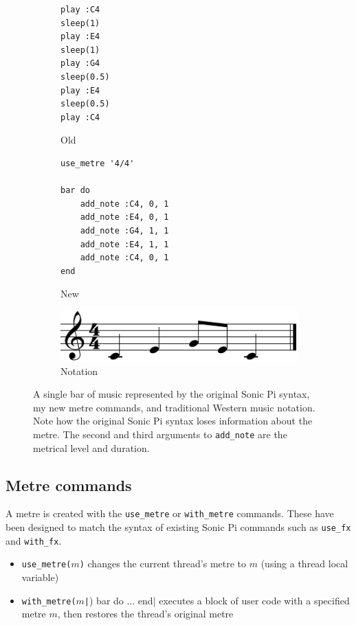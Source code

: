 \documentclass[12pt,twoside,openright]{report}
\begin{document}
\begin{figure}[ht]
    \centering
    \begin{subfigure}[b]{0.2\textwidth}
        \centering
        \begin{verbatim}
play :C4
sleep(1)
play :E4
sleep(1)
play :G4
sleep(0.5)
play :E4
sleep(0.5)
play :C4
        \end{verbatim}
        \caption{Old}
    \end{subfigure}
    \begin{subfigure}[b]{0.4\textwidth}
        \centering
        \begin{verbatim}
use_metre '4/4'

bar do
    add_note :C4, 0, 1
    add_note :E4, 0, 1
    add_note :G4, 1, 1
    add_note :E4, 1, 1
    add_note :C4, 0, 1
end
        \end{verbatim}
        \caption{New}
    \end{subfigure}
    \begin{subfigure}[b]{0.3\textwidth}
        \centering
        \includegraphics[width=\linewidth]{figures/sonic_pi_comparison.pdf}
        \caption{Notation}
    \end{subfigure}
    \cprotect\caption{A single bar of music represented by the original Sonic Pi syntax, my new metre commands, and traditional Western music notation. Note how the original Sonic Pi syntax loses information about the metre. The second and third arguments to \verb'add_note' are the metrical level and duration.}
    \label{fig:sonicpi_language_comparison}
\end{figure}


\subsection{Metre commands} \label{metre_commands}

A metre is created with the \verb'use_metre' or \verb'with_metre' commands. These have been
designed to match the syntax of existing Sonic Pi commands such as \verb'use_fx' and \verb'with_fx'.

\begin{itemize}
	\item \verb'use_metre('$m$\verb')' changes the current thread's metre to $m$ (using a thread local variable)
	\item \verb'with_metre('$m$\texttt|) bar do ... end| executes a block of user code with a
specified metre $m$, then restores the thread's original metre
\end{itemize}
\end{document}
